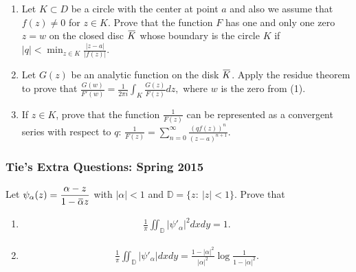 \begin{enumerate}
\def\labelenumi{(\arabic{enumi})}
\item
  Let \(K\subset D\) be a circle with the center at point \(a\) and also
  we assume that \(f(z)\not =0\) for \(z\in K\). Prove that the function
  \(F\) has one and only one zero \(z=w\) on the closed disc
  \(\mkern 1.5mu\overline{\mkern-1.5muK\mkern-1.5mu}\mkern 1.5mu\) whose
  boundary is the circle \(K\) if
  \(\displaystyle{ |q|<\min_{z\in K} \frac{|z-a|}{|f(z)|}.}\)\\
\item
  Let \(G(z)\) be an analytic function on the disk
  \(\mkern 1.5mu\overline{\mkern-1.5muK\mkern-1.5mu}\mkern 1.5mu\).
  Apply the residue theorem to prove that
  \(\displaystyle{ \frac{G(w)}{F'(w)}=\frac{1}{2\pi i}\int_K \frac{G(z)}{F(z)} dz,}\)
  where \(w\) is the zero from (1).\\
\item
  If \(z\in K\), prove that the function
  \(\displaystyle{\frac{1}{F(z)}}\) can be represented as a convergent
  series with respect to \(q\):
  \(\displaystyle{ \frac{1}{F(z)}=\sum_{n=0}^{\infty} \frac{(qf(z))^n}{(z-a)^{n+1}}.}\)
\end{enumerate}

\hypertarget{ties-extra-questions-spring-2015-3}{%
\subsubsection{Tie's Extra Questions: Spring
2015}\label{ties-extra-questions-spring-2015-3}}

\begin{problem}[?]

Let
\(\displaystyle{\psi_{\alpha}(z)=\frac{\alpha-z}{1-\mkern 1.5mu\overline{\mkern-1.5mu\alpha\mkern-1.5mu}\mkern 1.5muz}}\)
with \(|\alpha|<1\) and \(\mathbb D = \{z:\ |z|<1\}\). Prove that

\begin{enumerate}
\def\labelenumi{\alph{enumi}.}
\item

  \begin{align*}
  \displaystyle{\frac{1}{\pi}\iint_{{\mathbb D}} |\psi'_{\alpha}|^2 dx dy =1}
  .\end{align*}
\item

  \begin{align*}
  \displaystyle{\frac{1}{\pi}\iint_{{\mathbb D}} |\psi'_{\alpha}| dx dy =\frac{1-|\alpha|^2}{|\alpha|^2} \log \frac{1}{1-|\alpha|^2}}
  .\end{align*}
\end{enumerate}

\end{problem}

